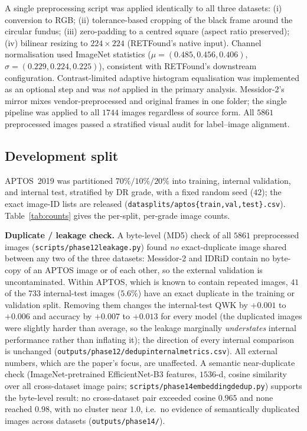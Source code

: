 \documentclass[journal]{IEEEtran}
\renewcommand{\_}{\origunderscore\allowbreak}
\begin{document}
A single preprocessing script was applied identically to all three datasets:
(i) conversion to RGB; (ii) tolerance-based cropping of the black frame around the
circular fundus; (iii) zero-padding to a centred square (aspect ratio preserved);
(iv) bilinear resizing to $224\times224$ (RETFound's native input). Channel
normalisation used ImageNet statistics
($\mu=(0.485,0.456,0.406)$, $\sigma=(0.229,0.224,0.225)$), consistent with
RETFound's downstream configuration. Contrast-limited adaptive histogram
equalisation was implemented as an optional step and was \emph{not} applied in the
primary analysis. Messidor-2's mirror mixes vendor-preprocessed and original
frames in one folder; the single pipeline was applied to all $1744$ images
regardless of source form. All $5861$ preprocessed images passed a stratified
visual audit for label--image alignment.

\subsection{Development split}
\label{sec:methods-split}

APTOS~2019 was partitioned $70\%/10\%/20\%$ into training, internal validation,
and internal test, stratified by DR grade, with a fixed random seed ($42$); the
exact image-ID lists are released
(\texttt{data\_splits/\allowbreak{}aptos\_\{train,val,test\}.csv}). Table~\ref{tab:counts}
gives the per-split, per-grade image counts.

\textbf{Duplicate / leakage check.} A byte-level (MD5) check of all $5861$
preprocessed images (\texttt{scripts/\allowbreak{}phase12\_leakage.py}) found \emph{no}
exact-duplicate image shared between any two of the three datasets: Messidor-2 and
IDRiD contain no byte-copy of an APTOS image or of each other, so the external
validation is uncontaminated. Within APTOS, which is known to contain repeated
images, $41$ of the $733$ internal-test images ($5.6\%$) have an exact duplicate
in the training or validation split. Removing them changes the internal-test QWK
by $+0.001$ to $+0.006$ and accuracy by $+0.007$ to $+0.013$ for every model (the
duplicated images were slightly harder than average, so the leakage marginally
\emph{understates} internal performance rather than inflating it); the direction
of every internal comparison is unchanged
(\texttt{outputs/\allowbreak{}phase12/\allowbreak{}dedup\_internal\_metrics.csv}). All external numbers,
which are the paper's focus, are unaffected. A semantic near-duplicate check
(ImageNet-pretrained EfficientNet-B3 features, $1536$-d, cosine similarity over
all cross-dataset image pairs; \texttt{scripts/\allowbreak{}phase14\_embedding\_dedup.py})
supports the byte-level result: no cross-dataset pair exceeded cosine $0.965$ and
none reached $0.98$, with no cluster near $1.0$, i.e.\ no evidence of
semantically duplicated images across datasets
(\texttt{outputs/\allowbreak{}phase14/\allowbreak{}}).
\end{document}
